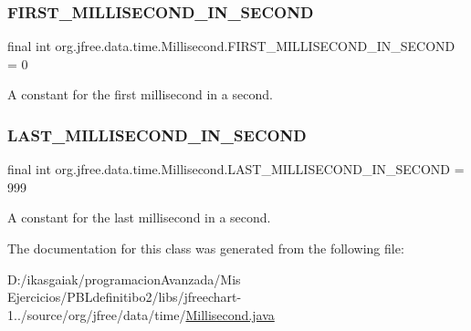 \subsubsection{\texorpdfstring{F\+I\+R\+S\+T\+\_\+\+M\+I\+L\+L\+I\+S\+E\+C\+O\+N\+D\+\_\+\+I\+N\+\_\+\+S\+E\+C\+O\+ND}{FIRST\_MILLISECOND\_IN\_SECOND}}
{\footnotesize\ttfamily final int org.\+jfree.\+data.\+time.\+Millisecond.\+F\+I\+R\+S\+T\+\_\+\+M\+I\+L\+L\+I\+S\+E\+C\+O\+N\+D\+\_\+\+I\+N\+\_\+\+S\+E\+C\+O\+ND = 0\hspace{0.3cm}{\ttfamily [static]}}

A constant for the first millisecond in a second. \mbox{\label{classorg_1_1jfree_1_1data_1_1time_1_1_millisecond_aebc94dc1b4d159c878c16c881c5d14f4}} 
\subsubsection{\texorpdfstring{L\+A\+S\+T\+\_\+\+M\+I\+L\+L\+I\+S\+E\+C\+O\+N\+D\+\_\+\+I\+N\+\_\+\+S\+E\+C\+O\+ND}{LAST\_MILLISECOND\_IN\_SECOND}}
{\footnotesize\ttfamily final int org.\+jfree.\+data.\+time.\+Millisecond.\+L\+A\+S\+T\+\_\+\+M\+I\+L\+L\+I\+S\+E\+C\+O\+N\+D\+\_\+\+I\+N\+\_\+\+S\+E\+C\+O\+ND = 999\hspace{0.3cm}{\ttfamily [static]}}

A constant for the last millisecond in a second. 

The documentation for this class was generated from the following file\+:\begin{DoxyCompactItemize}
\item 
D\+:/ikasgaiak/programacion\+Avanzada/\+Mis Ejercicios/\+P\+B\+Ldefinitibo2/libs/jfreechart-\/1../source/org/jfree/data/time/\mbox{\hyperlink{_millisecond_8java}{Millisecond.\+java}}\end{DoxyCompactItemize}
